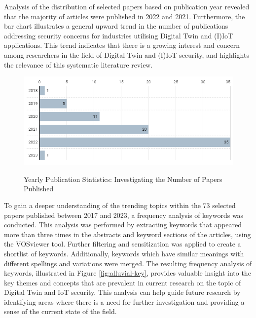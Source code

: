 Analysis of the distribution of selected papers based on publication year revealed that the majority of articles were published in 2022 and 2021. Furthermore, the bar chart illustrates a general upward trend in the number of publications addressing security concerns for industries utilising Digital Twin and (I)IoT applications. This trend indicates that there is a growing interest and concern among researchers in the field of Digital Twin and (I)IoT security, and highlights the relevance of this systematic literature review.

\begin{figure}[H]    
    \caption{Yearly Publication Statistics: Investigating the Number of Papers Published}
    \includegraphics[width=\textwidth]{images/year8.png}
    \label{fig:bar-chart-yaer}
\end{figure}

To gain a deeper understanding of the trending topics within the 73 selected papers published between 2017 and 2023, a frequency analysis of keywords was conducted. This analysis was performed by extracting keywords that appeared more than three times in the abstracts and keyword sections of the articles, using the VOSviewer tool. Further filtering and sensitization was applied to create a shortlist of keywords. Additionally, keywords which have similar meanings with different spellings and variations were merged. The resulting frequency analysis of keywords, illustrated in Figure \ref{fig:alluvial-key}, provides valuable insight into the key themes and concepts that are prevalent in current research on the topic of Digital Twin and IoT security. This analysis can help guide future research by identifying areas where there is a need for further investigation and providing a sense of the current state of the field.


